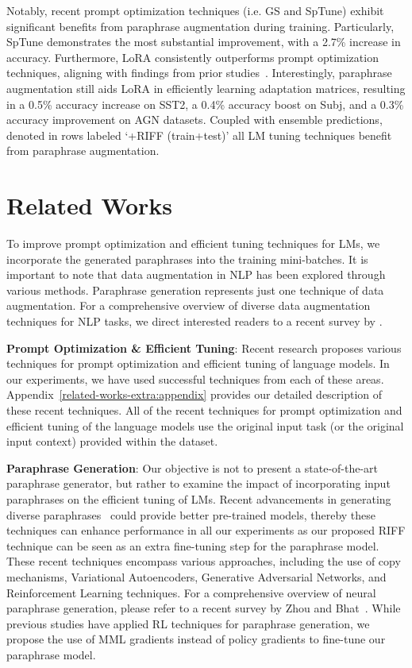 \documentclass[11pt]{article}
\begin{document}
Notably, recent prompt optimization techniques (i.e. GS and SpTune) exhibit significant benefits from paraphrase augmentation during training. Particularly, SpTune demonstrates the most substantial improvement, with a 2.7\% increase in accuracy. Furthermore, LoRA consistently outperforms prompt optimization techniques, aligning with findings from prior studies~\cite{DBLP:journals/corr/abs-2106-09685}. Interestingly, paraphrase augmentation still aids LoRA in efficiently learning adaptation matrices, resulting in a 0.5\% accuracy increase on SST2, a 0.4\% accuracy boost on Subj, and a 0.3\% accuracy improvement on AGN datasets. Coupled with ensemble predictions, denoted in rows labeled `+RIFF (train+test)' all LM tuning techniques benefit from paraphrase augmentation.

\section{Related Works} %
To improve prompt optimization and efficient tuning techniques for LMs, we incorporate the generated paraphrases into the training mini-batches. It is important to note that data augmentation in NLP has been explored through various methods. Paraphrase generation represents just one technique of data augmentation. For a comprehensive overview of diverse data augmentation techniques for NLP tasks, we direct interested readers to a recent survey by \citet{DBLP:journals/corr/abs-2106-07499}.

\noindent
{\bf Prompt Optimization \& Efficient Tuning}: Recent research proposes various techniques for prompt optimization and efficient tuning of language models. In our experiments, we have used successful techniques from each of these areas. Appendix~\ref{related-works-extra:appendix} provides our detailed description of these recent techniques.
All of the recent techniques for prompt optimization and efficient tuning of the language models use the original input task (or the original input context) provided within the dataset.

\noindent
{\bf Paraphrase Generation}:
Our objective is not to present a state-of-the-art paraphrase generator, but rather to examine the impact of incorporating input paraphrases on the efficient tuning of LMs. Recent advancements in generating diverse paraphrases~\cite{zhou-bhat-2021-paraphrase} could provide better pre-trained models, thereby these techniques can enhance performance in all our experiments as our proposed RIFF technique can be seen as an extra fine-tuning step for the paraphrase model. These recent techniques encompass various approaches, including the use of copy mechanisms, Variational Autoencoders, Generative Adversarial Networks, and Reinforcement Learning techniques. For a comprehensive overview of neural paraphrase generation, please refer to a recent survey by Zhou and Bhat~\cite{zhou-bhat-2021-paraphrase}. While previous studies have applied RL techniques for paraphrase generation, we propose the use of MML gradients instead of policy gradients to fine-tune our paraphrase model.
\end{document}
